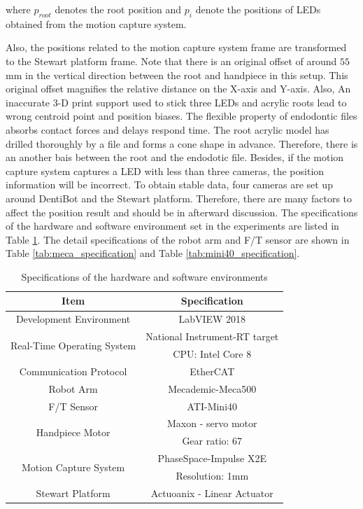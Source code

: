 where $p_{root}$ denotes the root position and $p_{i}$ denote the positions of LEDs obtained from the motion capture system. 
\par
Also, the positions related to the motion capture system frame are transformed to the Stewart platform frame. Note that there is an original offset of around $55$ mm in the vertical direction between the root and handpiece in this setup. This original offset magnifies the relative distance on the X-axis and Y-axis. Also, An inaccurate 3-D print support used to stick three LEDs and acrylic roots lead to wrong centroid point and position biases. The flexible property of endodontic files absorbs contact forces and delays respond time. The root acrylic model has drilled thoroughly by a file and forms a cone shape in advance. Therefore, there is an another bais between the root and the endodotic file. Besides, if the motion capture system captures a LED with less than three cameras, the position information will be incorrect. To obtain stable data, four cameras are set up around DentiBot and the Stewart platform. Therefore, there are many factors to affect the position result and should be in afterward discussion.
\newpage
The specifications of the hardware and software environment set in the experiments are listed in Table \ref{tab:exp_specification}. The detail specifications of the robot arm and F/T sensor are shown in Table \ref{tab:meca_specification} and Table \ref{tab:mini40_specification}.

\begin{table}[htbp]
\centering
\tabcolsep=20pt
\arrayrulewidth=1pt
\caption{Specifications of the hardware and software environments}
\label{tab:exp_specification}
\par
\begin{tabular}{|c|c|} 
\hline
\rowcolor{lightgray!40}Item						&Specification				\\	\hline
Development Environment							&LabVIEW 2018					\\	\hline
\multirow{2}{*}{Real-Time Operating System}		&National Instrument-RT target	\\
												&CPU: Intel Core 8				\\	\hline
Communication Protocol							&EtherCAT						\\	\hline
Robot Arm										&Mecademic-Meca500				\\	\hline
F/T Sensor										&ATI-Mini40						\\	\hline
\multirow{2}{*}{Handpiece Motor}							&Maxon - servo motor				\\
												&Gear ratio: 67					\\	\hline
\multirow{2}{*}{Motion Capture System}			&PhaseSpace-Impulse X2E 		\\
												&Resolution: 1mm				\\	\hline
Stewart Platform								&Actuoanix - Linear Actuator				\\	
\hline
\end{tabular}
\end{table}

